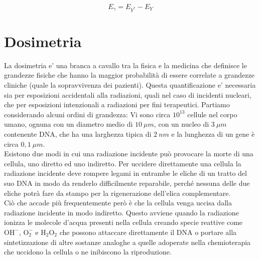 \begin{equation}
E_{\gamma}=E_{Y^*}-E_{Y}
\end{equation}

\chapter{Dosimetria}
La dosimetria e' una branca a cavallo tra la fisica e la medicina che definisce le grandezze fisiche che hanno la maggior probabilità di essere correlate a grandezze cliniche (quale la sopravvivenza dei pazienti). Questa quantificazione e' necessaria sia per esposizioni accidentali alla radiazioni, quali nel caso di incidenti nucleari, che per esposizioni intenzionali a radiazioni per fini terapeutici. Partiamo considerando alcuni ordini di grandezza:
Vi sono circa $10^{13}$ cellule nel corpo umano, ognuna con un diametro medio di $10 \ \mu m$, con un nucleo di $3 \ \mu m$ contenente DNA, che ha una larghezza tipica di $ 2 \ nm$ e la lunghezza di un gene è circa $0,1 \ \mu m$.  \\

Esistono due modi in cui una radiazione incidente può provocare la morte di una cellula, uno diretto ed uno indiretto. Per uccidere direttamente una cellula la radiazione incidente deve rompere legami in entrambe le eliche di un tratto del suo DNA in modo da renderlo difficilmente reparabile, perché nessuna delle due eliche potrà fare da stampo per la rigenerazione dell'elica complementare. \\
Ciò che accade più frequentemente però è che la cellula venga uccisa dalla radiazione incidente in modo indiretto. Questo avviene quando la radiazione ionizza le molecole d'acqua presenti nella cellula creando specie reattive come $\text{OH}^{-}$, $\text{O}_2^{-}$ e $\text{H}_2\text{O}_2$ che possono attaccare direttamente il DNA o portare alla sintetizzazione di altre sostanze analoghe a quelle adoperate nella chemioterapia che uccidono la cellula o ne inibiscono la riproduzione.\\
